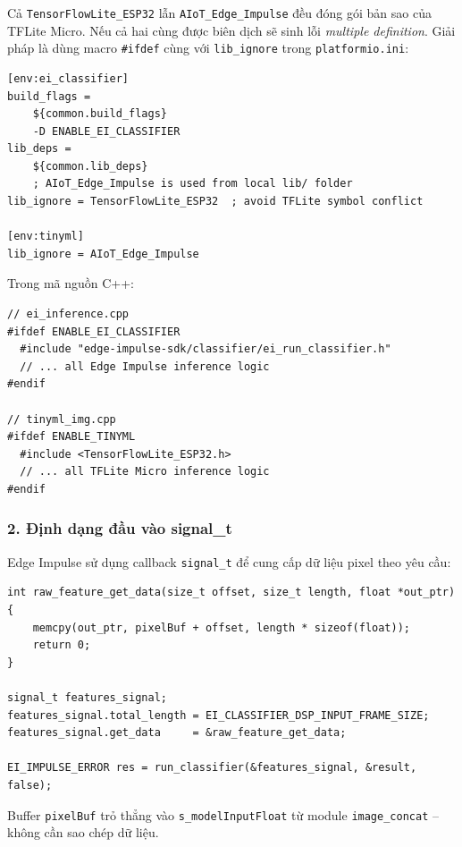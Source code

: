 \documentclass[12pt,a4paper]{article}
\begin{document}
Cả \texttt{TensorFlowLite\_ESP32} lẫn \texttt{AIoT\_Edge\_Impulse} đều đóng gói bản sao của TFLite Micro. Nếu cả hai cùng được biên dịch sẽ sinh lỗi \emph{multiple definition}. Giải pháp là dùng macro \texttt{\#ifdef} cùng với \texttt{lib\_ignore} trong \texttt{platformio.ini}:

\begin{lstlisting}[caption={\texttt{platformio.ini} -- loại trừ thư viện xung đột}]
[env:ei_classifier]
build_flags =
    ${common.build_flags}
    -D ENABLE_EI_CLASSIFIER
lib_deps =
    ${common.lib_deps}
    ; AIoT_Edge_Impulse is used from local lib/ folder
lib_ignore = TensorFlowLite_ESP32  ; avoid TFLite symbol conflict

[env:tinyml]
lib_ignore = AIoT_Edge_Impulse
\end{lstlisting}

Trong mã nguồn C++:
\begin{lstlisting}[caption={Guard macro để tách biệt hai back-end}]
// ei_inference.cpp
#ifdef ENABLE_EI_CLASSIFIER
  #include "edge-impulse-sdk/classifier/ei_run_classifier.h"
  // ... all Edge Impulse inference logic
#endif

// tinyml_img.cpp  
#ifdef ENABLE_TINYML
  #include <TensorFlowLite_ESP32.h>
  // ... all TFLite Micro inference logic
#endif
\end{lstlisting}

\subsubsection*{2. Định dạng đầu vào signal\_t}

Edge Impulse sử dụng callback \texttt{signal\_t} để cung cấp dữ liệu pixel theo yêu cầu:

\begin{lstlisting}[caption={Cài đặt signal\_t cho Edge Impulse}]
int raw_feature_get_data(size_t offset, size_t length, float *out_ptr) {
    memcpy(out_ptr, pixelBuf + offset, length * sizeof(float));
    return 0;
}

signal_t features_signal;
features_signal.total_length = EI_CLASSIFIER_DSP_INPUT_FRAME_SIZE;
features_signal.get_data     = &raw_feature_get_data;

EI_IMPULSE_ERROR res = run_classifier(&features_signal, &result, false);
\end{lstlisting}

Buffer \texttt{pixelBuf} trỏ thẳng vào \texttt{s\_modelInputFloat} từ module \texttt{image\_concat} -- không cần sao chép dữ liệu.
\end{document}
